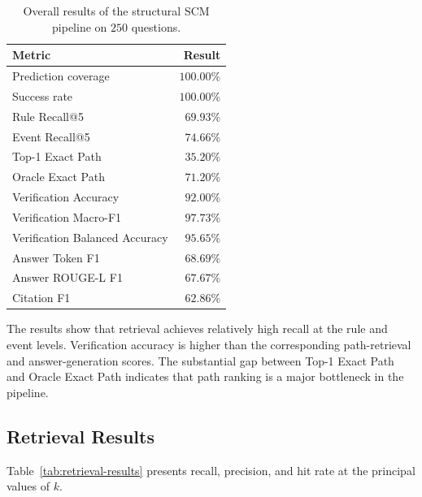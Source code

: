 \begin{table}[t]
    \centering
    \caption{Overall results of the structural SCM pipeline on \(250\)
    questions.}
    \label{tab:results}
    \begin{tabular}{lr}
        \hline
        \textbf{Metric} & \textbf{Result} \\
        \hline
        Prediction coverage & \(100.00\%\) \\
        Success rate & \(100.00\%\) \\
        Rule Recall@5 & \(69.93\%\) \\
        Event Recall@5 & \(74.66\%\) \\
        Top-1 Exact Path & \(35.20\%\) \\
        Oracle Exact Path & \(71.20\%\) \\
        Verification Accuracy & \(92.00\%\) \\
        Verification Macro-F1 & \(97.73\%\) \\
        Verification Balanced Accuracy & \(95.65\%\) \\
        Answer Token F1 & \(68.69\%\) \\
        Answer ROUGE-L F1 & \(67.67\%\) \\
        Citation F1 & \(62.86\%\) \\
        \hline
    \end{tabular}
\end{table}

The results show that retrieval achieves relatively high recall at the rule
and event levels. Verification accuracy is higher than the corresponding
path-retrieval and answer-generation scores. The substantial gap between
Top-1 Exact Path and Oracle Exact Path indicates that path ranking is a
major bottleneck in the pipeline.

\subsection{Retrieval Results}

Table~\ref{tab:retrieval-results} presents recall, precision, and hit rate at
the principal values of \(k\).

